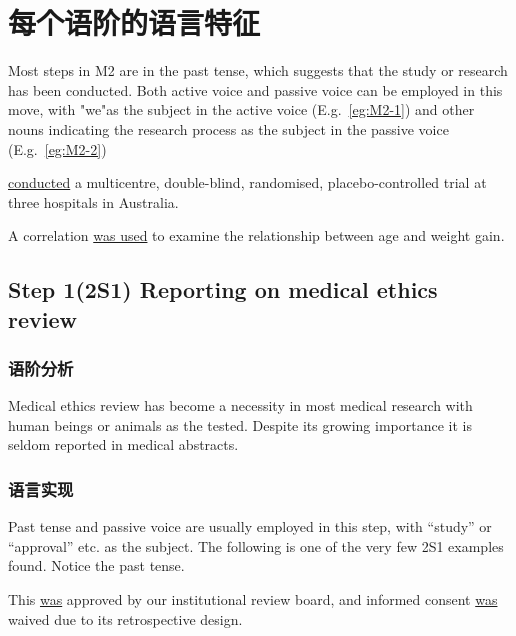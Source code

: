 \documentclass[a4paper]{ctexbook}
\begin{document}
\section{每个语阶的语言特征}

Most steps in M2 are in the past tense, which suggests that the study or research has been conducted. Both active voice and passive voice can be employed in this move, with "we"as the subject in the active voice (E.g.~\ref{eg:M2-1}) and other nouns indicating the research process as the subject in the passive voice (E.g.~\ref{eg:M2-2})

\begin{eg}[label={eg:M2-1}]{}
   \uline{conducted} a multicentre, double-blind, randomised, placebo-controlled trial at three hospitals in Australia.
\end{eg}

\begin{eg}[label={eg:M2-2}]{}
  A correlation  \uline{was used} to examine the relationship between age and weight gain.
\end{eg}

  \subsection{Step 1(2S1) Reporting on medical ethics review}

    \subsubsection{语阶分析}

    Medical ethics review has become a necessity in most medical research with human beings or animals as the tested. Despite its growing importance it is seldom reported in medical abstracts.

    \subsubsection{语言实现}

    Past tense and passive voice are usually employed in this step, with ``study'' or ``approval'' etc. as the subject. The following is one of the very few 2S1 examples found. Notice the past tense.
    
    \begin{eg}
      This  \uline{was} approved by our institutional review board, and informed consent \uline{was} waived due to its retrospective design.
    \end{eg}
\end{document}
